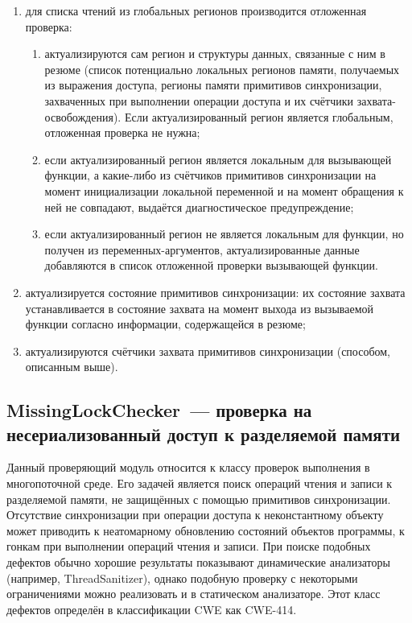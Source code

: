 \begin{enumerate}
 \item для списка чтений из глобальных регионов производится отложенная проверка:
 \begin{enumerate}
  \item актуализируются сам регион и структуры данных, связанные с ним в резюме (список потенциально локальных регионов памяти, получаемых из выражения доступа, регионы памяти примитивов синхронизации, захваченных при выполнении операции доступа и их счётчики захвата-освобождения). Если актуализированный регион является глобальным, отложенная проверка не нужна;
  \item если актуализированный регион является локальным для вызывающей функции, а какие-либо из счётчиков примитивов синхронизации на момент инициализации локальной переменной и на момент обращения к ней не совпадают, выдаётся диагностическое предупреждение;
  \item если актуализированный регион не является локальным для функции, но получен из переменных-аргументов, актуализированные данные добавляются в список отложенной проверки вызывающей функции. 
 \end{enumerate}
 \item актуализируется состояние примитивов синхронизации: их состояние захвата устанавливается в состояние захвата на момент выхода из вызываемой функции согласно информации, содержащейся в резюме;
 \item актуализируются счётчики захвата примитивов синхронизации (способом, описанным выше).
\end{enumerate}


\subsection{MissingLockChecker~--- проверка на несериализованный доступ к разделяемой памяти}

Данный проверяющий модуль относится к классу проверок выполнения в многопоточной среде. Его задачей является поиск операций чтения и записи к разделяемой памяти, не защищённых с помощью примитивов синхронизации. Отсутствие синхронизации при операции доступа к неконстантному объекту может приводить к неатомарному обновлению состояний объектов программы, к гонкам при выполнении операций чтения и записи. При поиске подобных дефектов обычно хорошие результаты показывают динамические анализаторы (например, ThreadSanitizer), однако подобную проверку с некоторыми ограничениями можно реализовать и в статическом анализаторе. Этот класс дефектов определён в классификации CWE как CWE-414.

